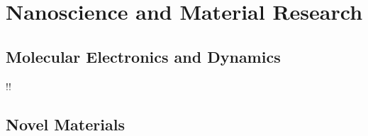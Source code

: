 \documentclass[11pt,a4paper,twoside,twocolumn]{article}
\makeatletter
\renewcommand*{\cleardoublepage}{\clearpage\if@twoside \ifodd\c@page\else
    \hbox{}
    \if!\blankpagetext!\else
    \vfil \begin{center} \setlength{\fboxsep}{3mm}%
    \framebox{\blankpagetext}
    \end{center}\vfil\vfil \fi
    \newpage\if@twocolumn\hbox{}\newpage\fi\fi\fi}
\makeatother
\begin{document}
\section{Nanoscience and Material Research}
\subsection{Molecular Electronics and Dynamics}
\begin{bibunit}[hplain]

\putbib[combined]
\end{bibunit}
%
\begin{bibunit}[hplain]

\putbib[combined]
\end{bibunit}
\begin{bibunit}[hplain]

\putbib[combined]
\end{bibunit}
%
\begin{bibunit}[hplain]

\putbib[combined]
\end{bibunit}
\begin{bibunit}[hplain]

\putbib[combined]
\end{bibunit}

\cleardoublepage
\subsection{Novel Materials}
\begin{bibunit}[hplain]

\putbib[combined]
\end{bibunit}
\begin{bibunit}[hplain]

\putbib[combined]
\end{bibunit}

\begin{bibunit}[hplain]

\putbib[combined]
\end{bibunit}
\begin{bibunit}[hplain]

\putbib[combined]
\end{bibunit}
\begin{bibunit}[hplain]

\putbib[combined]
\end{bibunit}
\end{document}
